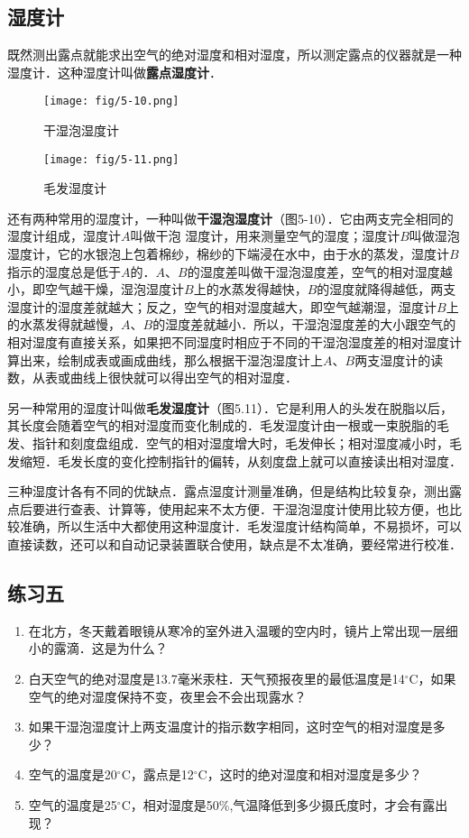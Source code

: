 \subsection{湿度计} 
既然测出露点就能求出空气的绝对湿度和相对湿度，所以测定露点的仪器就是一种湿度计．这种湿度计叫做\textbf{露点湿度计}．

\begin{figure}[htp]\centering
	\begin{minipage}[t]{0.48\textwidth}
		\centering
\texttt{[image: fig/5-10.png]}
\caption{干湿泡湿度计}
	\end{minipage}
	\begin{minipage}[t]{0.48\textwidth}
		\centering
\texttt{[image: fig/5-11.png]}
\caption{毛发湿度计}
	\end{minipage}
\end{figure}

还有两种常用的湿度计，一种叫做\textbf{干湿泡湿度计}（图5-10）．它由两支完全相同的湿度计组成，湿度计$A$叫做干泡
湿度计，用来测量空气的湿度；湿度计$B$叫做湿泡湿度计，它的水银泡上包着棉纱，棉纱的下端浸在水中，由于水的蒸发，湿度计$B$指示的湿度总是低于$A$的．$A$、$B$的湿度差叫做干湿泡湿度差，空气的相对湿度越小，即空气越干燥，湿泡湿度计$B$上的水蒸发得越快，$B$的湿度就降得越低，两支湿度计的湿度差就越大；反之，空气的相对湿度越大，即空气越潮湿，湿度计$B$上的水蒸发得就越慢，$A$、$B$的湿度差就越小．所以，干湿泡湿度差的大小跟空气的相对湿度有直接关系，如果把不同湿度时相应于不同的干湿泡湿度差的相对湿度计算出来，绘制成表或画成曲线，那么根据干湿泡湿度计上$A$、$B$两支湿度计的读数，从表或曲线上很快就可以得出空气的相对湿度．

另一种常用的湿度计叫做\textbf{毛发湿度计}（图5.11）．它是利用人的头发在脱脂以后，其长度会随着空气的相对湿度而变化制成的．毛发湿度计由一根或一束脱脂的毛发、指针和刻度盘组成．空气的相对湿度增大时，毛发伸长；相对湿度减小时，毛发缩短．毛发长度的变化控制指针的偏转，从刻度盘上就可以直接读出相对湿度．

三种湿度计各有不同的优缺点．露点湿度计测量准确，但是结构比较复杂，测出露点后要进行查表、计算等，使用起来不太方便．干湿泡湿度计使用比较方便，也比较准确，所以生活中大都使用这种湿度计．毛发湿度计结构简单，不易损坏，可以直接读数，还可以和自动记录装置联合使用，缺点是不太准确，要经常进行校准．

\subsection*{练习五}

\begin{enumerate}
	\item 在北方，冬天戴着眼镜从寒冷的室外进入温暖的空内时，镜片上常出现一层细小的露滴．这是为什么？
\item 白天空气的绝对湿度是13.7毫米汞柱．天气预报夜里的最低温度是14$^\circ$C，如果空气的绝对湿度保持不变，夜里会不会出现露水？
\item 如果干湿泡湿度计上两支温度计的指示数字相同，这时空气的相对湿度是多少？
\item 空气的温度是20$^\circ$C，露点是12$^\circ$C，这时的绝对湿度和相对湿度是多少？
\item 空气的温度是25$^\circ$C，相对湿度是50\%,气温降低到多少摄氏度时，才会有露出现？
\end{enumerate}

